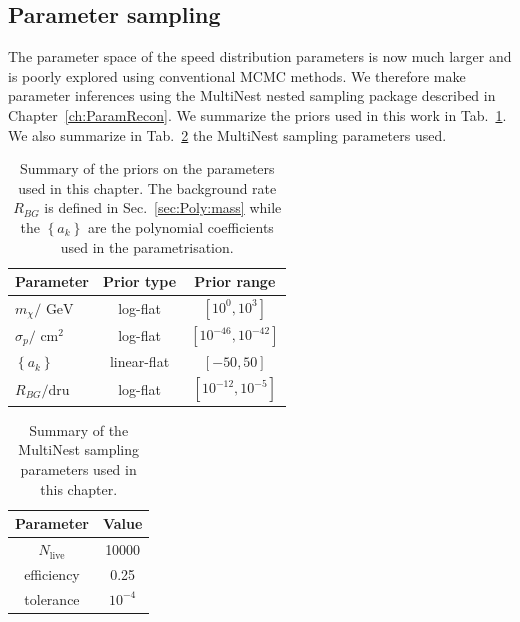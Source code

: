 \subsection{Parameter sampling}
\label{sec:Poly:ParamRecon}
The parameter space of the speed distribution parameters is now much larger and is poorly explored using conventional MCMC methods. We therefore make parameter inferences using the MultiNest nested sampling package described in Chapter~\ref{ch:ParamRecon}. We summarize the priors used in this work in Tab.~\ref{tab:Poly:priors}. We also summarize in Tab.~\ref{tab:Poly:MultiNest} the MultiNest sampling parameters used.

\begin{table}[t]
  \setlength{\extrarowheight}{2pt}
  \setlength{\tabcolsep}{3pt}
  \begin{center}
	\begin{tabular}{m{1in}|cc}
        \hline\hline
	Parameter & Prior type & Prior range\\
	\hline
	$m_\chi / \textrm{ GeV}$ &  log-flat & $\left[10^{0}, 10^{3}\right]$\\
	$\sigma_p / \textrm{ cm}^2$ & log-flat & $\left[10^{-46}, 10^{-42}\right]$ \\
	$\left\{a_k\right\}$ & linear-flat & $\left[-50, 50\right]$ \\
        $R_{BG} / \textrm{dru}$ & log-flat & $\left[10^{-12}, 10^{-5}\right]$ \\
        \hline\hline
	\end{tabular}
  \end{center}
\caption[Summary of the priors on the parameters used in Chapter \ref{ch:Poly}]{Summary of the priors on the parameters used in this chapter. The background rate $R_{BG}$ is defined in Sec.~\ref{sec:Poly:mass} while the $\left\{a_k\right\}$ are the polynomial coefficients used in the parametrisation.}
\label{tab:Poly:priors}
\end{table}

\begin{table}[t]
  \setlength{\extrarowheight}{2pt}
  \setlength{\tabcolsep}{3pt}
  \begin{center}
	\begin{tabular}{c|c}
        \hline\hline
        Parameter & Value \\
        \hline
	$N_\textrm{live}$ & 10000 \\
	efficiency & 0.25 \\
	tolerance & $10^{-4}$ \\
        \hline\hline
	\end{tabular}
  \end{center}
\caption[Summary of the MultiNest sampling parameters used in Chapter \ref{ch:Poly}]{Summary of the MultiNest sampling parameters used in this chapter.}
\label{tab:Poly:MultiNest}
\end{table}

